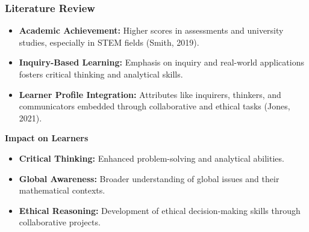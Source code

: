 \documentclass{beamer}
\begin{document}
\begin{frame}
  \frametitle{Literature Review}
  \begin{itemize}
      \item \textbf{Academic Achievement:} Higher scores in assessments and university studies, especially in STEM fields (Smith, 2019).
      \item \textbf{Inquiry-Based Learning:} Emphasis on inquiry and real-world applications fosters critical thinking and analytical skills.
      \item \textbf{Learner Profile Integration:} Attributes like inquirers, thinkers, and communicators embedded through collaborative and ethical tasks (Jones, 2021).
  \end{itemize}
  \vspace{0.3cm}
  \textbf{Impact on Learners}
  \begin{itemize}
      \item \textbf{Critical Thinking:} Enhanced problem-solving and analytical abilities.
      \item \textbf{Global Awareness:} Broader understanding of global issues and their mathematical contexts.
      \item \textbf{Ethical Reasoning:} Development of ethical decision-making skills through collaborative projects.
  \end{itemize}
  \vspace{0.3cm}
 
\end{frame}
\end{document}
